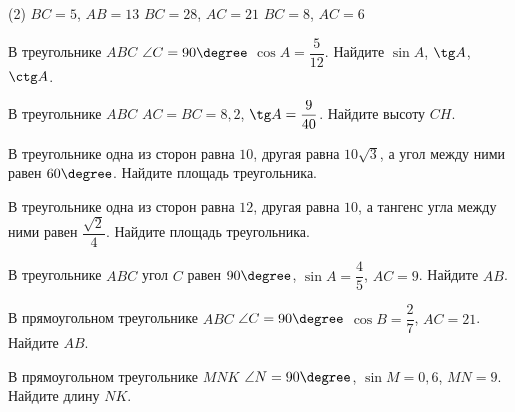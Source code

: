 \begin{class}[number=7]
\begin{listofex}[resume]
		\begin{tasks}(2)
			\task \( BC=5 \), \( AB=13 \)
			\task \( BC=28 \), \( AC=21 \)
			\task \( BC=8 \), \( AC=6 \)
		\end{tasks}
		\item В треугольнике \( ABC \) \( \angle C = 90\degree  \) \( \cos A = \dfrac{5}{12} \). Найдите \( \sin A \), \( \tg A \), \( \ctg A \).
		\item В треугольнике \( ABC \) \( AC = BC = 8,2 \), \(  \tg A=\dfrac{9}{40} \). Найдите высоту \( CH \).
		\item В треугольнике одна из сторон равна \( 10 \), другая равна \( 10\sqrt{3} \), а угол между ними равен \( 60\degree \). Найдите площадь треугольника.
		\item В треугольнике одна из сторон равна \( 12 \), другая равна \( 10 \), а тангенс угла между ними равен  \( \dfrac{\sqrt{2}}{4}\). Найдите площадь треугольника.
		\item В треугольнике \( ABC \) угол \( C \) равен \( 90\degree \), \( \sin A=\dfrac{4}{5} \), \( AC=9 \). Найдите \( AB \).
		\item В прямоугольном треугольнике \( ABC \) \( \angle C=90\degree \) \( \cos B=\dfrac{2}{7} \), \( AC=21 \). Найдите \( AB \).
		\item В прямоугольном треугольнике \( MNK \) \( \angle N = 90\degree \), \( \sin M = 0,6 \), \( MN=9 \). Найдите длину \( NK \).
	\end{listofex}
\end{class}

